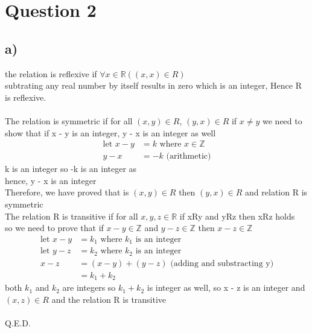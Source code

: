 \documentclass[11pt]{article}
\begin{document}

\section*{Question 2}
\subsection*{a)}

the relation is reflexive if $\forall x \in \mathbb{R} ((x,  x) \in R)$ \\
subtrating any real number by itself results in zero which is an integer, Hence
R is reflexive. \\
\\
The relation is symmetric if for all $(x, y) \in R$, $(y, x) \in R$ if $x \neq y$
we need to show that if x - y is an integer, y - x is an integer as well
%
\begin{align*}
    \text{let } x - y &= k \text{ where } x \in \mathbb{Z} \\
    y - x &= -k  \text{ (arithmetic)}
\end{align*}
%
k is an integer so -k is an integer as \\
hence, y - x is an integer \\
Therefore, we have proved that is $(x, y) \in R$ then $(y, x) \in R$
and relation R is symmetric
\\
The relation R is transitive if for all $x, y, z \in \mathbb{R}$ if xRy and yRz then xRz holds \\
so we need to prove that if $x - y \in \mathbb{Z}$ and $y - z \in \mathbb{Z}$ then $x - z \in \mathbb{Z}$
%
\begin{align*}
    \text{let } x - y &= k_{1} \text{ where $k_{1}$ is an integer} \\
    \text{let } y - z &= k_{2} \text{ where $k_{2}$ is an integer} \\
    x - z &= (x - y) + (y - z) \text{  (adding and substracting y)} \\
    &= k_{1} + k_{2}
\end{align*}
both $k_{1}$ and $k_{2}$ are integers so $k_{1} + k_{2}$ is integer as well,
so x - z is an integer and $(x, z) \in R$ and the relation R is transitive \\
\\
Q.E.D.
\end{document}
